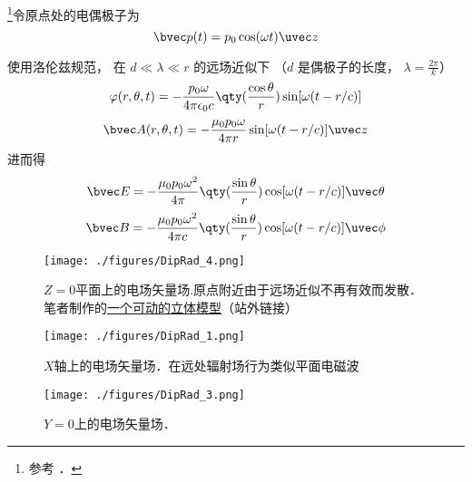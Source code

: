 
\begin{issues}
\issueDraft
\end{issues}


\footnote{参考 \cite{GriffE}．}令原点处的电偶极子为
\begin{equation}
\bvec p(t) = p_0 \cos(\omega t) \uvec z
\end{equation}

使用洛伦兹规范， 在 $d \ll \lambda \ll r$ 的远场近似下 （$d$ 是偶极子的长度， $\lambda = \frac{2\pi}{k}$）
\begin{equation}
\varphi(r, \theta, t) = -\frac{p_0\omega}{4\pi\epsilon_0 c} \qty(\frac{\cos\theta}{r}) \sin[\omega(t - r/c)]
\end{equation}
\begin{equation}
\bvec A(r, \theta, t) = -\frac{\mu_0 p_0 \omega}{4\pi r} \sin[\omega(t - r/c)]\uvec z
\end{equation}
进而得
\begin{equation}
\bvec E = -\frac{\mu_0 p_0\omega^2}{4\pi} \qty(\frac{\sin\theta}{r})\cos[\omega(t - r/c)]\uvec \theta
\end{equation}
\begin{equation}
\bvec B = -\frac{\mu_0 p_0\omega^2}{4\pi c} \qty(\frac{\sin\theta}{r})\cos[\omega(t - r/c)]\uvec \phi
\end{equation}

\begin{figure}[ht]
\centering
\texttt{[image: ./figures/DipRad\_4.png]}
\caption{$Z=0$平面上的电场矢量场.原点附近由于远场近似不再有效而发散．笔者制作的\href{https://www.geogebra.org/m/xnputtwr}{一个可动的立体模型}（站外链接）} \label{DipRad_fig4}
\end{figure}

\begin{figure}[ht]
\centering
\texttt{[image: ./figures/DipRad\_1.png]}
\caption{$X$轴上的电场矢量场．在远处辐射场行为类似平面电磁波 } \label{DipRad_fig1}
\end{figure}

\begin{figure}[ht]
\centering
\texttt{[image: ./figures/DipRad\_3.png]}
\caption{$Y=0$上的电场矢量场．} \label{DipRad_fig3}
\end{figure}

